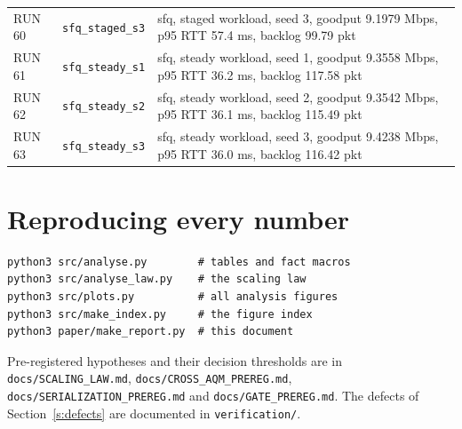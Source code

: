 \documentclass[11pt,a4paper]{article}
\begin{document}
\begin{longtable}{p{1.5cm}p{5.0cm}p{9.5cm}}
RUN 60 & \texttt{sfq\_staged\_s3} & sfq, staged workload, seed 3, goodput 9.1979 Mbps, p95 RTT 57.4 ms, backlog 99.79 pkt \\
RUN 61 & \texttt{sfq\_steady\_s1} & sfq, steady workload, seed 1, goodput 9.3558 Mbps, p95 RTT 36.2 ms, backlog 117.58 pkt \\
RUN 62 & \texttt{sfq\_steady\_s2} & sfq, steady workload, seed 2, goodput 9.3542 Mbps, p95 RTT 36.1 ms, backlog 115.49 pkt \\
RUN 63 & \texttt{sfq\_steady\_s3} & sfq, steady workload, seed 3, goodput 9.4238 Mbps, p95 RTT 36.0 ms, backlog 116.42 pkt \\
\bottomrule
\end{longtable}

\section{Reproducing every number}\label{s:repro}

\begin{verbatim}
python3 src/analyse.py        # tables and fact macros
python3 src/analyse_law.py    # the scaling law
python3 src/plots.py          # all analysis figures
python3 src/make_index.py     # the figure index
python3 paper/make_report.py  # this document
\end{verbatim}

Pre-registered hypotheses and their decision thresholds are in
\texttt{docs/SCALING\_LAW.md}, \texttt{docs/CROSS\_AQM\_PREREG.md},
\texttt{docs/SERIALIZATION\_PREREG.md} and \texttt{docs/GATE\_PREREG.md}. The
defects of Section~\ref{s:defects} are documented in \texttt{verification/}.



\end{document}
